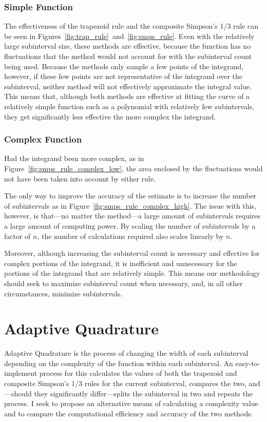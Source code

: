 \documentclass{paper}
\begin{document}
\subsubsection{Simple Function}
The effectiveness of the trapezoid rule and the composite Simpson's 1/3 rule can be seen in Figures~\ref{fig:trap_rule}~and~\ref{fig:smps_rule}.
Even with the relatively large subinterval size, these methods are effective, because the function has no fluctuations that the method would not account for with the subinterval count being used.
Because the methods only sample a few points of the integrand, however, if these few points are not representative of the integrand over the subinterval, neither method will not effectively approximate the integral value.
This means that, although both methods are effective at fitting the curve of a relatively simple function such as a polynomial with relatively few subintervals, they get significantly less effective the more complex the integrand.

\subsubsection{Complex Function}
Had the integrand been more complex, as in Figure~\ref{fig:smps_rule_complex_low}, the area enclosed by the fluctuations would not have been taken into account by either rule.
%
%

%
The only way to improve the accuracy of the estimate is to increase the number of subintervals as in Figure~\ref{fig:smps_rule_complex_high}.
The issue with this, however, is that---no matter the method---a large amount of subintervals requires a large amount of computing power.
By scaling the number of subintervals by a factor of \(n\), the number of calculations required also scales linearly by \(n\).
%
%

%
Moreover, although increasing the subinterval count is necessary and effective for complex portions of the integrand, it is inefficient and unnecessary for the portions of the integrand that are relatively simple.
This means our methodology should seek to maximize subinterval count when necessary, and, in all other circumstances, minimize subintervals.

\section{Adaptive Quadrature}
Adaptive Quadrature is the process of changing the width of each subinterval depending on the complexity of the function within each subinterval.
An easy-to-implement process for this calculates the values of both the trapezoid and composite Simpson's 1/3 rules for the current subinterval, compares the two, and---should they significantly differ---splits the subinterval in two and repeats the process. %
I seek to propose an alternative means of calculating a complexity value and to compare the computational efficiency and accuracy of the two methods.
\end{document}
